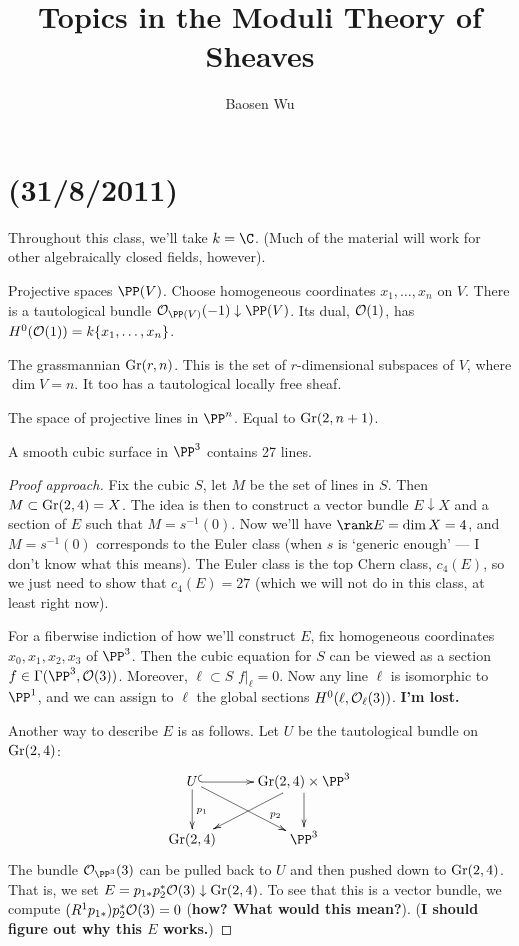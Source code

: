 \documentclass[11pt]{article}
\title{Topics in the Moduli Theory of Sheaves}
\author{Baosen Wu}
\date{}
\newcommand{\NewLecture}[3]{\section{#1 {\small(#2/#3/2011)}}}
\begin{document}
\maketitle
\NewLecture{}{31}{8}
Throughout this class, we'll take $k=\C$. (Much of the material will work for
other algebraically closed fields, however).
\begin{exmp*}
Projective spaces $\PP(V)$. Choose homogeneous coordinates $x_1,\ldots,x_n$ on
$V$. There is a tautological bundle $\calO_{\PP(V)}(-1)\downarrow \PP(V)$. Its
dual, $\mathcal{O}(1)$, has $H^0(\mathcal{O}(1))=k\{x_1,\ldots,x_n\}$.
\end{exmp*}
\begin{exmp*}
The grassmannian $\textup{Gr}(r,n)$. This is the set of $r$-dimensional subspaces of
$V$, where $\dim V=n$. It too has a tautological locally free sheaf.
\end{exmp*}
\begin{exmp*}
The space of projective lines in $\PP^n$. Equal to $\textup{Gr}(2,n+1)$.
\end{exmp*}
\begin{thm*}[classical]
A smooth cubic surface in $\PP^3$ contains 27 lines.
\end{thm*}
\begin{proof}[Proof approach]
Fix the cubic $S$, let $M$ be the set of lines in $S$. Then $M\subset
\textup{Gr}(2,4)=X$. The idea is then to construct a vector bundle $E\downarrow X$ and a
section of $E$ such that $M=s^{-1}(0)$. Now we'll have $\rank E=\dim X=4$, and
$M=s^{-1}(0)$ corresponds to the Euler class (when $s$ is `generic enough' --- I
don't know what this means). The Euler class is the top Chern class, $c_4(E)$,
so we just need to show that $c_4(E)=27$ {\small(which we will not do in this
class, at least right now)}.

For a fiberwise indiction of how we'll construct $E$, fix homogeneous
coordinates $x_0,x_1,x_2,x_3$ of $\PP^3$. Then the cubic equation for $S$ can be
viewed as a section $f\in\Gamma(\PP^3,\calO(3))$. Moreover, $\ell\subset S$ \Iff
$f|_\ell=0$. Now any line $\ell$ is isomorphic to $\PP^1$, and we can assign to
$\ell$ the global sections $H^0(\ell,\mathcal{O}_\ell(3))$. \textbf{I'm lost.}

Another way to describe $E$ is as follows. Let $U$ be the tautological bundle on
$\textup{Gr}(2,4)$:
\[\xymatrix{
\ar[d]^{p_1}\ar[dr]^(.7){p_2}U\ar@{^{(}->}[r]&\Gr(2,4)\times
\PP^3\ar[d]\ar[dl]\\
\Gr(2,4)&\PP^3
}\]
The bundle $\calO_{\PP^3}(3)$ can be pulled back to $U$ and then pushed down to
$\textup{Gr}(2,4)$. That is, we set $E=p_{1*}p_2^*\mathcal{O}(3)\downarrow\textup{Gr}(2,4)$. To see
that this is a vector bundle, we compute $(R^1p_{1*})p_2^*\mathcal{O}(3)=0$
(\textbf{how? What would this mean?}). (\textbf{I should figure out why this $E$
works.})
\end{proof}
\end{document}
